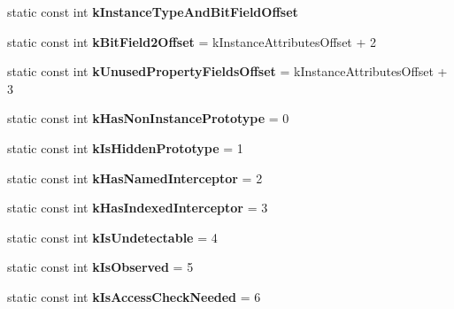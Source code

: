 \begin{DoxyCompactItemize}
\item 
static const int {\bfseries k\+Instance\+Type\+And\+Bit\+Field\+Offset}
\item 
\hypertarget{classv8_1_1internal_1_1_map_a82252f8d0b1dbf43ae262d742ff4ac40}{}static const int {\bfseries k\+Bit\+Field2\+Offset} = k\+Instance\+Attributes\+Offset + 2\label{classv8_1_1internal_1_1_map_a82252f8d0b1dbf43ae262d742ff4ac40}

\item 
\hypertarget{classv8_1_1internal_1_1_map_afa596db997f369a1206e2acf2fa94d1d}{}static const int {\bfseries k\+Unused\+Property\+Fields\+Offset} = k\+Instance\+Attributes\+Offset + 3\label{classv8_1_1internal_1_1_map_afa596db997f369a1206e2acf2fa94d1d}

\item 
\hypertarget{classv8_1_1internal_1_1_map_a625118736a731f98f24fb0b46def35c4}{}static const int {\bfseries k\+Has\+Non\+Instance\+Prototype} = 0\label{classv8_1_1internal_1_1_map_a625118736a731f98f24fb0b46def35c4}

\item 
\hypertarget{classv8_1_1internal_1_1_map_afbe267cd52fb4634f1c2f4722d06d514}{}static const int {\bfseries k\+Is\+Hidden\+Prototype} = 1\label{classv8_1_1internal_1_1_map_afbe267cd52fb4634f1c2f4722d06d514}

\item 
\hypertarget{classv8_1_1internal_1_1_map_ae1bcc8aebd00c892cc929c10bcda0239}{}static const int {\bfseries k\+Has\+Named\+Interceptor} = 2\label{classv8_1_1internal_1_1_map_ae1bcc8aebd00c892cc929c10bcda0239}

\item 
\hypertarget{classv8_1_1internal_1_1_map_a2fb730e0d0fa7622af6a0cc07386fc6b}{}static const int {\bfseries k\+Has\+Indexed\+Interceptor} = 3\label{classv8_1_1internal_1_1_map_a2fb730e0d0fa7622af6a0cc07386fc6b}

\item 
\hypertarget{classv8_1_1internal_1_1_map_a23419f5d3c0c3bdecfd11e8d67649ab5}{}static const int {\bfseries k\+Is\+Undetectable} = 4\label{classv8_1_1internal_1_1_map_a23419f5d3c0c3bdecfd11e8d67649ab5}

\item 
\hypertarget{classv8_1_1internal_1_1_map_ada1945ba34ec2b3b0500c1613a3421d1}{}static const int {\bfseries k\+Is\+Observed} = 5\label{classv8_1_1internal_1_1_map_ada1945ba34ec2b3b0500c1613a3421d1}

\item 
\hypertarget{classv8_1_1internal_1_1_map_a4166f71f4987249578dabb3e24b8f4e7}{}static const int {\bfseries k\+Is\+Access\+Check\+Needed} = 6\label{classv8_1_1internal_1_1_map_a4166f71f4987249578dabb3e24b8f4e7}


\end{DoxyCompactItemize}
